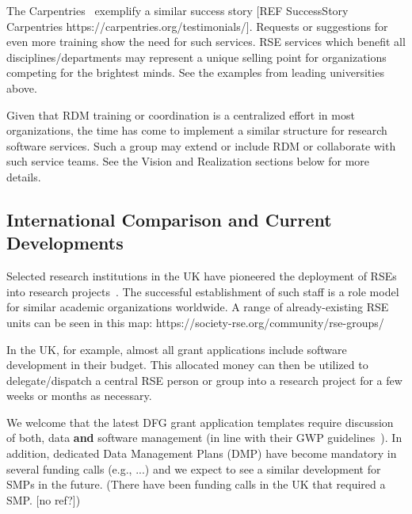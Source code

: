 \documentclass[a4paper]{article}
\begin{document}
The Carpentries~\autocite{Carpentries} exemplify a similar success story [REF SuccessStory Carpentries https://carpentries.org/testimonials/].
Requests or suggestions for even more training show the need for such services.
RSE services which benefit all disciplines/departments may represent a unique selling point for organizations competing for the brightest minds.
See the examples from leading universities above.

Given that RDM training or coordination is a centralized effort in most organizations, the time has come to implement a similar structure for research software services.
Such a group may extend or include RDM or collaborate with such service teams.
See the Vision and Realization sections below for more details.

\subsection{International Comparison and Current Developments}


Selected research institutions in the UK have pioneered the deployment of RSEs into research projects~\autocite{Crouch2013}.
The successful establishment of such staff is a role model for similar academic organizations worldwide.
A range of already-existing RSE units can be seen in this map: https://society-rse.org/community/rse-groups/

In the UK, for example, almost all grant applications include software development in their budget.
This allocated money can then be utilized to delegate/dispatch a central RSE person or group into a research project for a few weeks or months as necessary.

We welcome that the latest DFG grant application templates require discussion of both, data \textbf{and} software management (in line with their GWP guidelines~\autocite{dfg_gsp}).
In addition, dedicated Data Management Plans (DMP) have become mandatory in several funding calls (e.g., ...) and we expect to see a similar development for SMPs in the future. (There have been funding calls in the UK that required a SMP. [no ref?])
\end{document}
